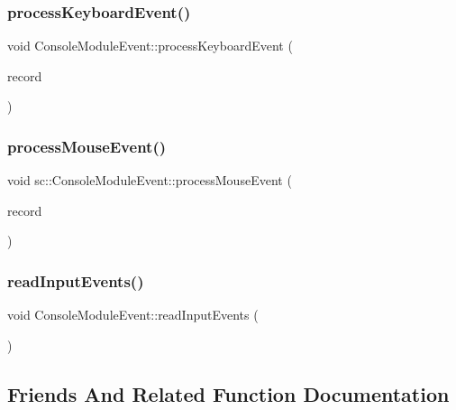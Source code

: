 \subsubsection{\texorpdfstring{processKeyboardEvent()}{processKeyboardEvent()}}
{\footnotesize\ttfamily void Console\+Module\+Event\+::process\+Keyboard\+Event (\begin{DoxyParamCaption}\item[{const I\+N\+P\+U\+T\+\_\+\+R\+E\+C\+O\+RD \&}]{record }\end{DoxyParamCaption})\hspace{0.3cm}{\ttfamily [private]}}

\mbox{\label{classsc_1_1_console_module_event_a1500a488043b4ff64ec003a5a70ea7e3}} 
\subsubsection{\texorpdfstring{processMouseEvent()}{processMouseEvent()}}
{\footnotesize\ttfamily void sc\+::\+Console\+Module\+Event\+::process\+Mouse\+Event (\begin{DoxyParamCaption}\item[{const I\+N\+P\+U\+T\+\_\+\+R\+E\+C\+O\+RD \&}]{record }\end{DoxyParamCaption})\hspace{0.3cm}{\ttfamily [private]}}

\mbox{\label{classsc_1_1_console_module_event_ac33e2f27e2cf1f78e8237eb415a3008b}} 
\subsubsection{\texorpdfstring{readInputEvents()}{readInputEvents()}}
{\footnotesize\ttfamily void Console\+Module\+Event\+::read\+Input\+Events (\begin{DoxyParamCaption}{ }\end{DoxyParamCaption})}



\subsection{Friends And Related Function Documentation}
\mbox{\label{classsc_1_1_console_module_event_aaa98810874c67664127370c7d8dc2ece}} 

